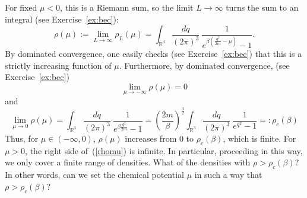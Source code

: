 \documentclass{ian}
\begin{document}
\indent
For fixed $\mu<0$, this is a Riemann sum, so the limit $L\to\infty$ turns the sum to an integral (see Exercise\-~\ref{ex:bec}):
\begin{equation}
  \rho(\mu):=\lim_{L\to\infty}\rho_L(\mu)
  =
  \int_{\mathbb R^3}\frac{dq}{(2\pi)^3}\ 
  \frac1{e^{\beta(\frac{q^2}{2m}-\mu)}-1}
  .
  \label{rhomu}
\end{equation}
By dominated convergence, one easily checks (see Exercise\-~\ref{ex:bec}) that this is a strictly increasing function of $\mu$.
Furthermore, by dominated convergence, (see Exercise\-~\ref{ex:bec})
\begin{equation}
  \lim_{\mu\to-\infty}\rho(\mu)=0
  \label{lim_rhomu_infty}
\end{equation}
and
\begin{equation}
  \lim_{\mu\to0}\rho(\mu)=
  \int_{\mathbb R^3}\frac{dq}{(2\pi)^3}\ 
  \frac1{e^{\beta\frac{q^2}{2m}}-1}
  =
  \left(\frac{2m}\beta\right)^{\frac32}
  \int_{\mathbb R^3}\frac{dq}{(2\pi)^3}\ 
  \frac1{e^{q^2}-1}
  =:\rho_c(\beta)
  \label{lim_rhomu_0}
\end{equation}
Thus, for $\mu\in(-\infty,0)$, $\rho(\mu)$ increases from $0$ to $\rho_c(\beta)$, which is finite.
For $\mu>0$, the right side of\-~(\ref{rhomu}) is infinite.
In particular, proceeding in this way, we only cover a finite range of densities.
What of the densities with $\rho>\rho_c(\beta)$?
In other words, can we set the chemical potential $\mu$ in such a way that $\rho>\rho_c(\beta)$?
\bigskip
\end{document}
